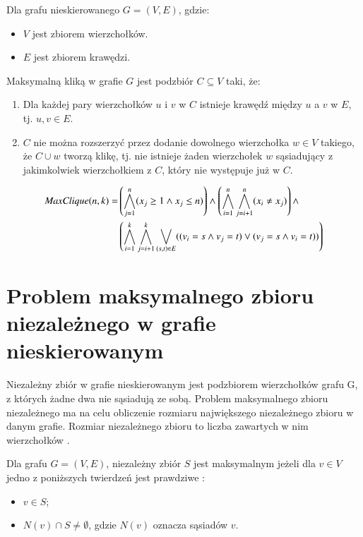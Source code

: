 Dla grafu nieskierowanego $G = (V, E)$, gdzie:
\begin{itemize}
 	\item \(V\) jest zbiorem wierzchołków.
 	\item \(E\) jest zbiorem krawędzi.
\end{itemize}
Maksymalną kliką w grafie \(G\) jest podzbiór $C \subseteq V$ taki, że:
\begin{enumerate}
 	\item Dla każdej pary wierzchołków \(u\) i \(v\) w \(C\) istnieje krawędź między \(u\) a \(v\) w \(E\), tj. ${u, v}\in E$. 
 	\item \(C\) nie można rozszerzyć przez dodanie dowolnego wierzchołka $w\in V$ takiego, że $C \cup {w}$ tworzą klikę, tj. nie istnieje żaden wierzchołek \(w\) sąsiadujący z jakimkolwiek wierzchołkiem z \(C\), który nie występuje już w \(C\).
\end{enumerate}

\begin{align*}
	{\mathit{MaxClique}}(n, k) = &\left( \bigwedge_{j=1}^{n} (x_j \geq 1 \land x_j \leq n) \right) \land 
	\left( \bigwedge_{i=1}^{n} \bigwedge_{j=i+1}^{n} (x_i \neq x_j) \right) \land \\
	&\left( \bigwedge_{i=1}^{k} \bigwedge_{j=i+1}^{k} \bigvee_{(s,t) \in E} ((v_i = s \land v_j = t) \lor (v_j = s \land v_i = t)) \right)	
\end{align*}


\section{Problem maksymalnego zbioru niezależnego w grafie nieskierowanym}
Niezależny zbiór w grafie nieskierowanym jest podzbiorem wierzchołków grafu G, z których żadne dwa nie sąsiadują ze sobą. Problem maksymalnego zbioru niezależnego ma na celu obliczenie rozmiaru największego niezależnego zbioru w danym grafie. Rozmiar niezależnego zbioru to liczba zawartych w nim wierzchołków \cite{Korshunov1974}.

Dla grafu $G = (V, E)$, niezależny zbiór \(S\) jest maksymalnym jeżeli dla $v \in V$ jedno z poniższych twierdzeń jest prawdziwe \cite{maxIndSetDef}:

\begin{itemize}
	\item $v \in S$;
	\item $N(v) \cap S \neq \emptyset$, gdzie \(N(v)\) oznacza sąsiadów \(v\).
\end{itemize}

